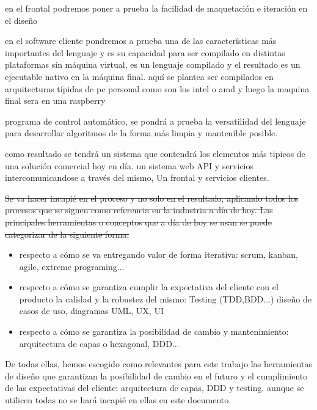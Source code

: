 en el frontal podremos poner a prueba la facilidad de maquetación e iteración en el diseño


en el software cliente pondremos a prueba una de las características más importantes del lenguaje y es su capacidad para ser compilado en distintas plataformas sin máquina virtual, es un lenguaje compilado y el resultado es un ejecutable nativo en la máquina final. aquí se plantea ser compilados en arquitecturas típidas de pc personal como son los intel o amd y luego la maquina final sera en una raspberry 


programa de control automático, se pondrá a prueba la versatilidad del lenguaje para desarrollar algoritmos de la forma más limpia y mantenible posible.


como resultado se tendrá un sistema que contendrá los elementos más tipicos de una solución comercial hoy en día. un sistema web API y servicios intercomunicandose a través del mismo, Un frontal y servicios clientes.


\sout{Se va hacer incapié en el proceso y no solo en el resultado, aplicando todos los procesos que se siguen como referencia en la industria a día de hoy.  Las principales herramientas o conceptos que a día de hoy se usan se puede categorizar de la siguiente forma:
}
\begin{itemize}
	\item respecto a cómo se va entregando valor de forma iterativa: scrum, kanban, agile, extreme programing...
	\item respecto a cómo se garantiza cumplir la expectativa del cliente con el producto la calidad y la robustez del mismo: Testing (TDD,BDD...) diseño de casos de uso, diagramas UML, UX, UI
	\item respecto a cómo se garantiza la posibilidad de cambio y mantenimiento: arquitectura de capas o hexagonal, DDD... 
\end{itemize} 

De todas ellas, hemos escogido como relevantes para este trabajo las herramientas de diseño que garantizan la posibilidad de cambio en el futuro y el cumplimiento de las expectativas del cliente: arquitectura de capas, DDD y testing. aunque se utilicen todas no se hará incapié en ellas en este documento.


